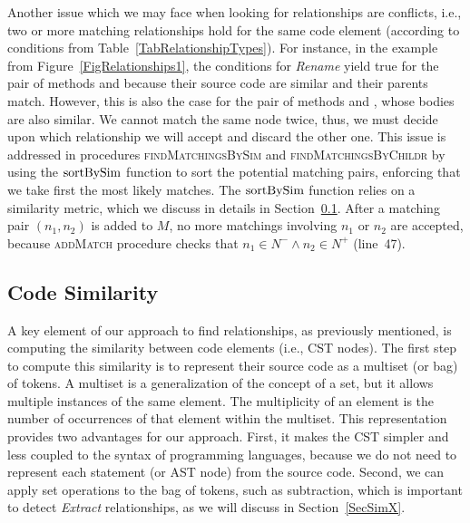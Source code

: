 Another issue which we may face when looking for relationships are conflicts, i.e., two or more matching relationships hold for the same code element (according to conditions from Table~\ref{TabRelationshipTypes}).
For instance, in the example from Figure~\ref{FigRelationships1}, the conditions for \textit{Rename} yield true for the pair of methods  and  because their source code are similar and their parents match.
However, this is also the case for the pair of methods  and , whose bodies are also similar.
We cannot match the same node twice, thus, we must decide upon which relationship we will accept and discard the other one.
This issue is addressed in procedures \textsc{findMatchingsBySim} and \textsc{findMatchingsByChildr} by using the $\operatorname{sortBySim}$ function to sort the potential matching pairs, enforcing that we take first the most likely matches.
The $\operatorname{sortBySim}$ function relies on a similarity metric, which we discuss in details in Section~\ref{SecCodeSim}.
After a matching pair $(n_1, n_2)$ is added to $M$, no more matchings involving $n_1$ or $n_2$ are accepted, because \textsc{addMatch} procedure checks that $n_1 \in N^- \land n_2 \in N^+$ (line~47).







\subsection{Code Similarity}
\label{SecCodeSim}



A key element of our approach to find relationships, as previously mentioned, is computing the similarity between code elements (i.e., CST nodes).
The first step to compute this similarity is to represent their source code as a multiset (or bag) of tokens.
A multiset is a generalization of the concept of a set, but it allows multiple instances of the same element.
The multiplicity of an element is the number of occurrences of that element within the multiset.
This representation provides two advantages for our approach.
First, it makes the CST simpler and less coupled to the syntax of programming languages, because we do not need to represent each statement (or AST node) from the source code. Second, we can apply set operations to the bag of tokens, such as subtraction, which is important to detect \emph{Extract} relationships, as we will discuss in Section~\ref{SecSimX}.

